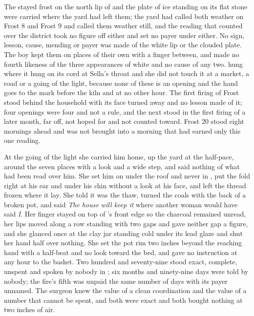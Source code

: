 The stayed frost on the north lip of  and the plate of ice standing on its flat stone were carried where the yard had left them; the yard had called both weather on Frost 8 and Frost 9 and called them weather still, and the reading that counted over the district took no figure off either and set no payer under either. No sign, lesson, cause, mending or payer was made of the white lip or the clouded plate. The boy kept them on places of their own with a finger between, and made no fourth likeness of the three appearances of white and no cause of any two.  hung where it hung on its cord at Sella's throat and she did not touch it at a market, a road or a going of the light, because none of these is an opening and the hand goes to the mark before the kiln and at no other hour. The first firing of Frost stood behind the household with its face turned away and no lesson made of it; four openings were four and not a rule, and the next stood in the first firing of a later month, far off, not hoped for and not counted toward. Frost 20 stood eight mornings ahead and was not brought into a morning that had earned only this one reading.

At the going of the light she carried him home, up the yard at the half-pace, around the seven places with a look and a wide step, and said nothing of what had been read over him. She set him on  under the roof and never in , put the fold right at his ear and under his chin without a look at his face, and left the thread frozen where it lay. She told  it was the thaw, turned the coals with the back of a broken pot, and said \emph{The house will keep it} where another woman would have said \emph{I}. Her finger stayed on top of 's front edge so the charcoal remained unread, her lips moved along a row standing with two gaps and gave neither gap a figure, and she glanced once at the clay jar standing cold under its lead glaze and shut her hand half over nothing. She set the pot rim two inches beyond the reaching hand with a half-beat and no look toward the bed, and gave no instruction at any hour to the basket. Two hundred and seventy-nine stood exact, complete, unspent and spoken by nobody in ; six months and ninety-nine days were told by nobody; the fire's fifth was unpaid the same number of days with its payer unnamed. The surgeon knew the value of a clean coordination and the value of a number that cannot be spent, and both were exact and both bought nothing at two inches of air.

